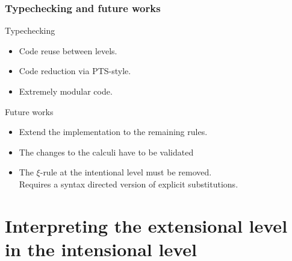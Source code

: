 \documentclass{beamer}
\begin{document}
\begin{frame}{}\frametitle{Typechecking and future works}

\begin{block}{Typechecking}
\begin{itemize}
	\item Code reuse between levels.
	\item Code reduction via PTS-style.
	\item Extremely modular code.
\end{itemize}
\end{block}
\begin{block}{Future works}
\begin{itemize}
	\item Extend the implementation to the remaining rules.
	\item The changes to the calculi have to be validated
	\item The $\xi$-rule at the intentional level must be removed.\\
          Requires a syntax directed version of explicit substitutions.
\end{itemize}
\end{block}
\end{frame}

\section[Interpretation]{Interpreting the extensional level in the intensional level}
\end{document}
